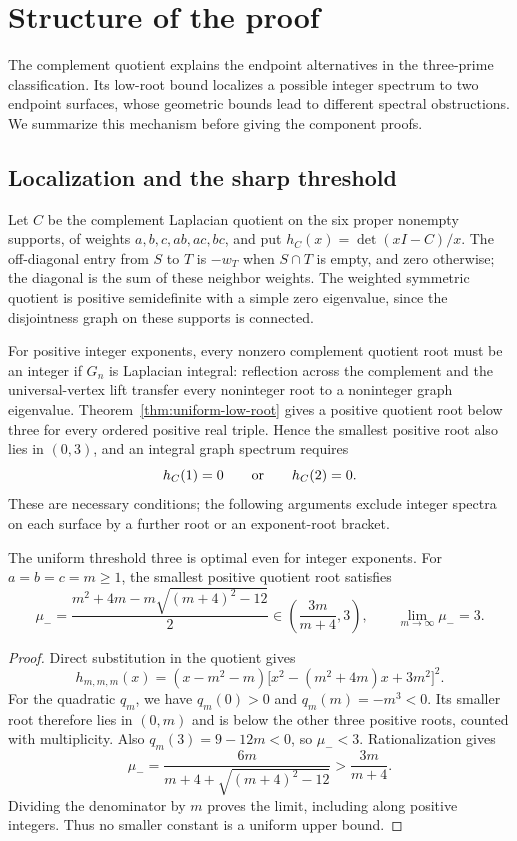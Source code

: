 \section{Structure of the proof}
\label{sec:proof-structure}

The complement quotient explains the endpoint alternatives in the
three-prime classification. Its low-root bound localizes a possible
integer spectrum to two endpoint surfaces, whose geometric bounds lead
to different spectral obstructions. We summarize this mechanism before
giving the component proofs.

\subsection{Localization and the sharp threshold}

Let $C$ be the complement Laplacian quotient on the six proper nonempty
supports, of weights $a,b,c,ab,ac,bc$, and put $h_C(x)=\det(xI-C)/x$.
The off-diagonal entry from $S$ to $T$ is $-w_T$ when $S\cap T$ is empty,
and zero otherwise; the diagonal is the sum of these neighbor weights.
The weighted symmetric quotient is positive semidefinite with a simple
zero eigenvalue, since the disjointness graph on these supports is connected.

For positive integer exponents, every nonzero complement quotient root
must be an integer if $G_n$ is Laplacian integral: reflection across the
complement and the universal-vertex lift transfer every noninteger root
to a noninteger graph eigenvalue. Theorem~\ref{thm:uniform-low-root}
gives a positive quotient root below three for every ordered positive
real triple. Hence the smallest positive root also lies in $(0,3)$,
and an integral graph spectrum requires
\[
 h_C(1)=0\qquad\hbox{or}\qquad h_C(2)=0.
\]
These are necessary conditions; the following arguments exclude integer
spectra on each surface by a further root or an exponent-root bracket.

\begin{proposition}
\label{prop:localization-sharpness}
The uniform threshold three is optimal even for integer exponents.
For $a=b=c=m\geq1$, the smallest positive quotient root satisfies
\[
 \mu_-=
 \frac{m^2+4m-m\sqrt{(m+4)^2-12}}{2}
 \in\left(\frac{3m}{m+4},3\right),
 \qquad \lim_{m\to\infty}\mu_-=3.
\]
\end{proposition}
\begin{proof}
Direct substitution in the quotient gives
\[
 h_{m,m,m}(x)=(x-m^2-m)
 \bigl[x^2-(m^2+4m)x+3m^2\bigr]^2.
\]
For the quadratic $q_m$, we have $q_m(0)>0$ and $q_m(m)=-m^3<0$.
Its smaller root therefore lies in $(0,m)$ and is below the other
three positive roots, counted with multiplicity. Also
$q_m(3)=9-12m<0$, so $\mu_-<3$. Rationalization gives
\[
 \mu_-=
 \frac{6m}{m+4+\sqrt{(m+4)^2-12}}
 >\frac{3m}{m+4}.
\]
Dividing the denominator by $m$ proves the limit, including along
positive integers. Thus no smaller constant is a uniform upper bound.
\end{proof}

